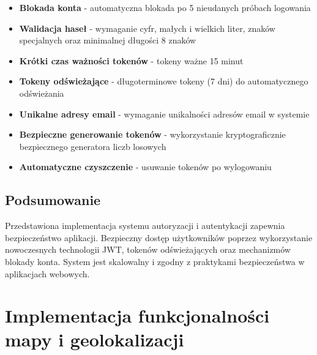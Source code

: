 \begin{itemize}
	\item \textbf{Blokada konta} - automatyczna blokada po 5 nieudanych próbach logowania
	\item \textbf{Walidacja haseł} - wymaganie cyfr, małych i wielkich liter, znaków specjalnych oraz minimalnej długości 8 znaków
	\item \textbf{Krótki czas ważności tokenów} - tokeny ważne 15 minut
	\item \textbf{Tokeny odświeżające} - długoterminowe tokeny (7 dni) do automatycznego odświeżania
	\item \textbf{Unikalne adresy email} - wymaganie unikalności adresów email w systemie
	\item \textbf{Bezpieczne generowanie tokenów} - wykorzystanie kryptograficznie bezpiecznego generatora liczb losowych
	\item \textbf{Automatyczne czyszczenie} - usuwanie tokenów po wylogowaniu
\end{itemize}

\subsection{Podsumowanie}
Przedstawiona implementacja systemu autoryzacji i autentykacji zapewnia bezpieczeństwo aplikacji. Bezpieczny dostęp użytkowników poprzez wykorzystanie nowoczesnych technologii JWT, tokenów odświeżających oraz mechanizmów blokady konta. System jest skalowalny i zgodny z praktykami bezpieczeństwa w aplikacjach webowych.

\section{Implementacja funkcjonalności mapy i geolokalizacji}
